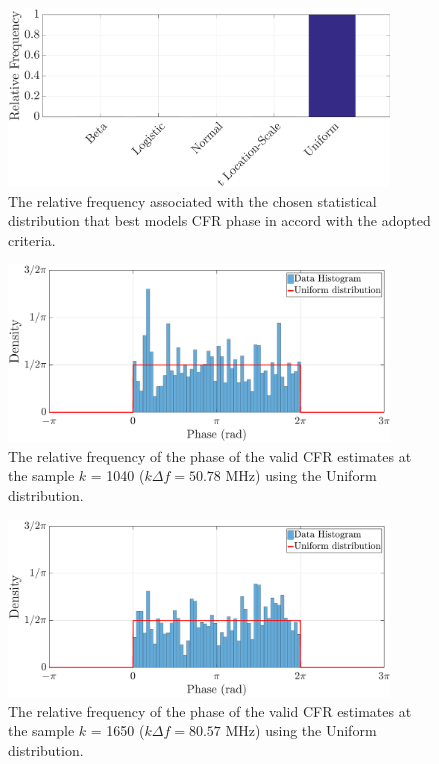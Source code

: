 \begin{figure}[h!]
	\centering
	\includegraphics[width=0.9\textwidth]{images/Phase_percentsW.eps}
	\caption{The relative frequency associated with the chosen statistical distribution that best models CFR phase in accord with the adopted criteria.}
	\label{Phase_percentsW}
\end{figure}

\begin{figure}[h!]
	\centering
	\includegraphics[width=0.9\textwidth]{images/Phase_histsW_2.eps}
	\caption{The relative frequency of the phase of the valid CFR estimates at the sample $k$ = 1040 ($k\Delta f= 50.78$ MHz) using the Uniform distribution.}
	\label{phase_examplesW}
\end{figure}

\begin{figure}[h!]
	\centering
	\includegraphics[width=0.9\textwidth]{images/Phase_hist2sW_2.eps}
	\caption{The relative frequency of the phase of the valid CFR estimates at the sample $k$ = 1650 ($k\Delta f= 80.57$ MHz) using the Uniform distribution.}
	\label{phase_example2sW}
\end{figure}

